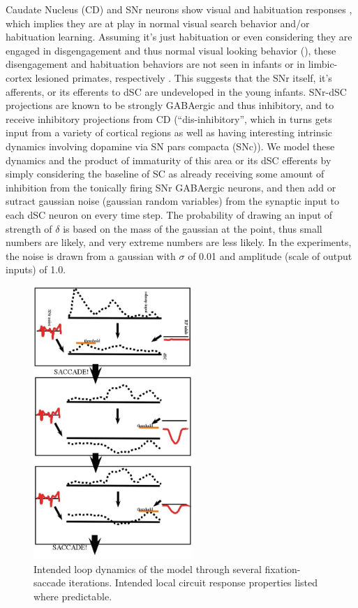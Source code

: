 \documentclass[conference]{IEEEtran}
\begin{document}
Caudate Nucleus (CD) and SNr neurons show visual and habituation
responses \cite{hikosaka_wurtz_1983_SNr1}, which implies they are at
play in normal visual search behavior and/or habituation
learning. Assuming it's just habituation or even considering they are
engaged in disgengagement and thus normal visual looking behavior
(\cite{johnson_1990}), these disengagement and habituation behaviors
are not seen in infants or in limbic-cortex lesioned primates,
respectively \cite{bachevalier_etal_1993_limbicrecog}. This suggests
that the SNr itself, it's afferents, or its efferents to dSC are
undeveloped in the young infants. SNr-dSC projections are known to be
strongly GABAergic and thus inhibitory, and to receive inhibitory
projections from CD (``dis-inhibitory'', which in turns gets input
from a variety of cortical regions as well as having interesting
intrinsic dynamics involving dopamine via SN pars compacta (SNc)). We
model these dynamics and the product of immaturity of this area or its
dSC efferents by simply considering the baseline of SC as already
receiving some amount of inhibition from the tonically firing SNr
GABAergic neurons, and then add or sutract gaussian noise (gaussian
random variables) from the synaptic input to each dSC neuron on every
time step. The probability of drawing an input of strength of $\delta$
is based on the mass of the gaussian at the point, thus small numbers
are likely, and very extreme numbers are less likely. In the
experiments, the noise is drawn from a gaussian with $\sigma$ of 0.01
and amplitude (scale of output inputs) of 1.0.

\begin{figure} [!t]
\centering
\includegraphics[width=6.0cm]{looking_functional_loop.jpg}
\caption{Intended loop dynamics of the model through several
  fixation-saccade iterations. Intended local circuit response
  properties listed where predictable.}
\label{fig:looking_functional_loop}
\end{figure}
\end{document}
